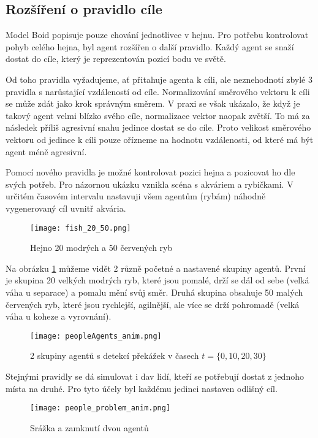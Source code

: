 \subsection{Rozšíření o pravidlo cíle}
Model Boid popisuje pouze chování jednotlivce v hejnu. Pro potřebu kontrolovat pohyb celého hejna, byl agent rozšířen o další pravidlo. Každý agent se snaží dostat do cíle, který je reprezentován pozicí bodu ve světě. 
\par
Od toho pravidla vyžadujeme, ať přitahuje agenta k cíli, ale neznehodnotí zbylé 3 pravidla s narůstající vzdáleností od cíle. Normalizování směrového vektoru k cíli se může zdát jako krok správným směrem. V praxi se však ukázalo, že když je takový agent velmi blízko svého cíle, normalizace vektor naopak zvětší. To má za následek příliš agresivní snahu jedince dostat se do cíle. Proto velikost směrového vektoru od jedince k cíli pouze ořízneme na hodnotu vzdálenosti, od které má být agent méně agresivní. 
\par
Pomocí nového pravidla je možné kontrolovat pozici hejna a pozicovat ho dle svých potřeb. Pro názornou ukázku vznikla scéna s akváriem a rybičkami. V určitém časovém intervalu nastavuji všem agentům (rybám) náhodně vygenerovaný cíl uvnitř akvária.  
\begin{figure}[H]
	\label{fig:ryby_20_50}
	\texttt{[image: fish\_20\_50.png]}
	\centering
	\caption{Hejno 20 modrých a 50 červených ryb}
\end{figure}
Na obrázku \ref{fig:ryby_20_50} můžeme vidět 2 různě početné a nastavené skupiny agentů. První je skupina 20 velkých modrých ryb, které jsou pomalé, drží se dál od sebe (velká váha u separace) a pomalu mění svůj směr. Druhá skupina obsahuje 50 malých červených ryb, které jsou rychlejší, agilnější, ale více se drží pohromadě (velká váha u koheze a vyrovnání). 
\begin{figure}[H]
	\texttt{[image: peopleAgents\_anim.png]}
	\centering
	\caption{2 skupiny agentů s detekcí překážek v časech $t=\{ 0,10,20,30\} $}
\end{figure}

Stejnými pravidly se dá simulovat i dav lidí, kteří se potřebují dostat z jednoho místa na druhé. Pro tyto účely byl každému jedinci nastaven odlišný cíl. 


\begin{figure}[H]
	\texttt{[image: people\_problem\_anim.png]}
	\centering
	\caption{Srážka a zamknutí dvou agentů}
\end{figure}

